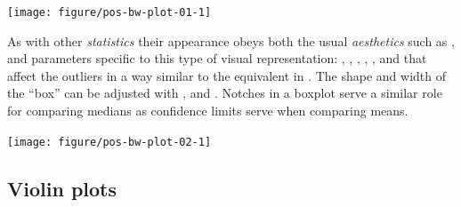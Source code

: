 \documentclass[krantz2]{krantz}\usepackage{knitr}%
\begin{document}
\begin{knitrout}\footnotesize
{}\color{fgcolor}\begin{kframe}
\begin{alltt}
  \hlopt{+}
  \hlstd{()}
\end{alltt}
\end{kframe}

{\centering \texttt{[image: figure/pos-bw-plot-01-1]} 

}



\end{knitrout}

As with other \emph{statistics} their appearance obeys both the usual \emph{aesthetics} such as , and parameters specific to this type of visual representation: , , , , ,  and  that affect the outliers in a way similar to the equivalent  in . The shape and width of the ``box'' can be adjusted with ,  and . Notches in a boxplot serve a similar role for comparing medians as confidence limits serve when comparing means.

\begin{knitrout}\footnotesize
{}\color{fgcolor}\begin{kframe}
\begin{alltt}
  \hlopt{+}
  \hlstd{(} \hlstd{=} \hlstd{,}  \hlstd{=} \hlstd{,}
                \hlstd{=} \hlstd{,}  \hlstd{=} \hlstd{,}  \hlstd{=} \hlstd{)}
\end{alltt}
\end{kframe}

{\centering \texttt{[image: figure/pos-bw-plot-02-1]} 

}



\end{knitrout}


\subsection{Violin plots}\label{sec:plot:violin}
\end{document}
